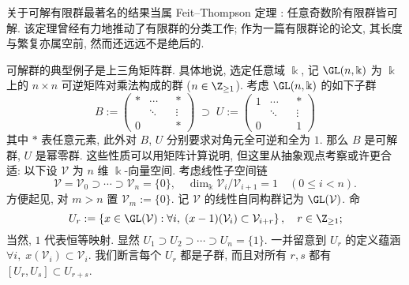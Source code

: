 关于可解有限群最著名的结果当属 Feit--Thompson 定理 \cite{FT63}: 任意奇数阶有限群皆可解. 该定理曾经有力地推动了有限群的分类工作; 作为一篇有限群论的论文, 其长度与繁复亦属空前, 然而还远远不是绝后的.

\begin{example}
	可解群的典型例子是上三角矩阵群. 具体地说, 选定任意域 $\Bbbk$, 记 $\GL(n,\Bbbk)$ 为 $\Bbbk$ 上的 $n \times n$ 可逆矩阵对乘法构成的群 ($n \in \Z_{\geq 1}$). 考虑 $\GL(n, \Bbbk)$ 的如下子群
	\[
		B := \begin{pmatrix}
		* & \cdots & & * \\
		& \ddots & & \vdots \\
		0 & & & *
	\end{pmatrix} \; \supset \;
		U := \begin{pmatrix}
		1 & \cdots & & * \\
		& \ddots & & \vdots \\
		0 & & & 1
	\end{pmatrix} \]
	其中 $*$ 表任意元素, 此外对 $B$, $U$ 分别要求对角元全可逆和全为 $1$. 那么 $B$ 是可解群, $U$ 是幂零群. 这些性质可以用矩阵计算说明, 但这里从抽象观点考察或许更合适: 以下设 $\mathcal{V}$ 为 $n$ 维 $\Bbbk$-向量空间. 考虑线性子空间链
	\[ \mathcal{V} = \mathcal{V}_0 \supset \cdots \supset \mathcal{V}_n = \{0\}, \quad \dim_\Bbbk \mathcal{V}_i/\mathcal{V}_{i+1} = 1 \quad (0 \leq i < n). \]
	方便起见, 对 $m > n$ 置 $\mathcal{V}_m := \{0\}$. 记 $\mathcal{V}$ 的线性自同构群记为 $\GL(\mathcal{V})$. 命
	\begin{equation*}
		U_r := \left\{ x \in \GL(\mathcal{V}) : \forall i, \; (x - 1)(\mathcal{V}_i) \subset \mathcal{V}_{i+r} \right\}, \quad r \in \Z_{\geq 1};
	\end{equation*}
	当然, $1$ 代表恒等映射. 显然 $U_1 \supset U_2 \supset \cdots \supset U_n = \{1\}$. 一并留意到 $U_r$ 的定义蕴涵 $\forall i, \; x(\mathcal{V}_i) \subset \mathcal{V}_i$. 我们断言每个 $U_r$ 都是子群, 而且对所有 $r,s$ 都有 $[U_r, U_s] \subset U_{r+s}$.


\end{example}
